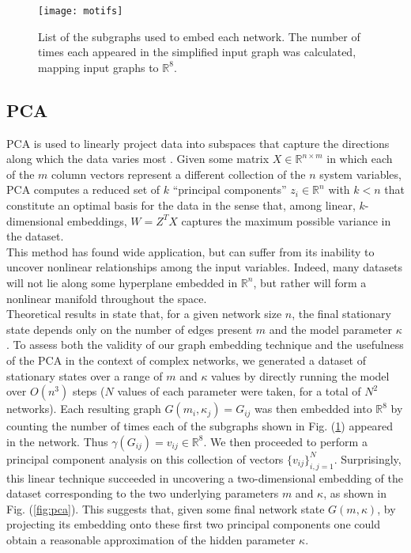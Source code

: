 \documentclass[epjST, final]{svjour}
\begin{document}
\begin{onehalfspace}
\begin{figure}[h!]
  \vspace{-5mm}
  \centering
  \texttt{[image: motifs]}
  \caption{List of the subgraphs used to embed each network. The
    number of times each appeared in the simplified input graph was
    calculated, mapping input graphs to $\mathbb{R}^8$. \label{fig:motifs}}
\end{figure}

\subsection{PCA}
\label{sec:pca}

PCA is used to linearly project data into subspaces that capture the
directions along which the data varies most
\cite{jolliffe_principal_2014}. Given some matrix
$X \in \mathbb{R}^{n \times m}$ in which each of the $m$ column
vectors represent a different collection of the $n$ system variables,
PCA computes a reduced set of $k$ ``principal components''
$z_i \in \mathbb{R}^n$ with $k < n$ that constitute an optimal basis
for the data in the sense that, among linear, $k$-dimensional embeddings, $W = Z^TX$
captures the maximum possible variance in the dataset. \\

This method has found wide application, but can suffer from its
inability to uncover nonlinear relationships among the input
variables. Indeed, many datasets will not lie along some hyperplane
embedded in $\mathbb{R}^n$, but rather will form a nonlinear manifold
throughout the space. \\

Theoretical results in \cite{rath_time_2012} state that, for a given network
size $n$, the final stationary state depends only on the number of
edges present $m$ and the model parameter $\kappa$. To assess both the
validity of our graph embedding technique and the usefulness of the
PCA in the context of complex networks, we generated a dataset of
stationary states over a range of $m$ and $\kappa$ values by directly
running the model over $O(n^3)$ steps ($N$ values of each parameter
were taken, for a total of $N^2$ networks). Each resulting
graph $G(m_i, \kappa_j) = G_{ij}$ was then embedded into
$\mathbb{R}^8$ by counting the number of times each of the subgraphs
shown in Fig. (\ref{fig:motifs}) appeared in the network. Thus
$\gamma(G_{ij}) = v_{ij} \in \mathbb{R}^8$. We then proceeded to
perform a principal component analysis on this collection of vectors
$\{v_{ij}\}_{i,j=1}^N$. Surprisingly, this linear technique succeeded in
uncovering a two-dimensional embedding of the dataset corresponding to
the two underlying parameters $m$ and $\kappa$, as shown in
Fig. (\ref{fig:pca}). This suggests that, given some final network
state $G(m, \kappa)$, by projecting its embedding onto these first two
principal components one could obtain a reasonable approximation of
the hidden parameter $\kappa$.


\end{onehalfspace}
\end{document}
